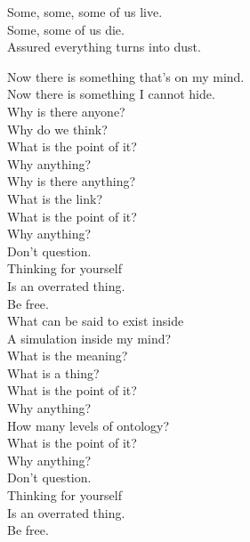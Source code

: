 Some, some, some of us live. \\
Some, some of us die. \\
Assured everything turns into dust. \\





Now there is something that's on my mind. \\
Now there is something I cannot hide. \\
Why is there anyone? \\
Why do we think? \\
What is the point of it? \\
Why anything? \\
Why is there anything? \\
What is the link? \\
What is the point of it? \\
Why anything? \\

Don't question. \\
Thinking for yourself \\
Is an overrated thing. \\
Be free. \\

What can be said to exist inside \\
A simulation inside my mind? \\
What is the meaning? \\
What is a thing? \\
What is the point of it? \\
Why anything? \\
How many levels of ontology? \\
What is the point of it? \\
Why anything? \\

Don't question. \\
Thinking for yourself \\
Is an overrated thing. \\
Be free. \\



